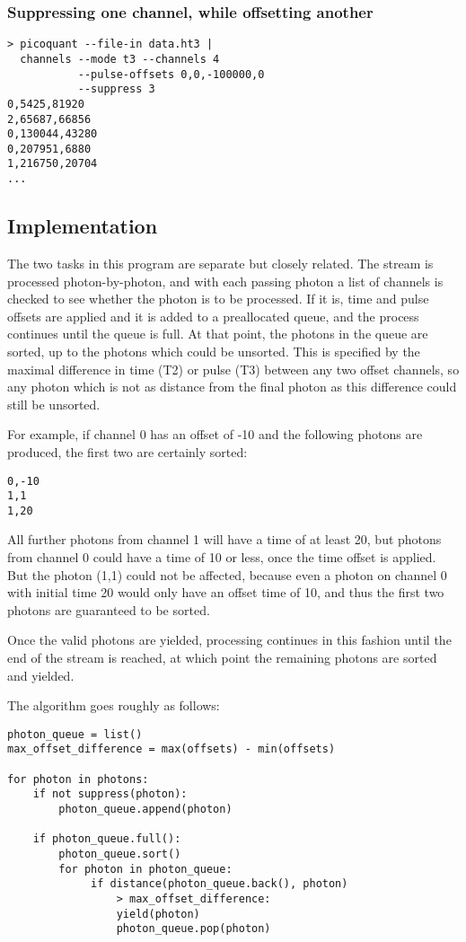 \subsubsection{Suppressing one channel, while offsetting another}
\begin{verbatim}
> picoquant --file-in data.ht3 |
  channels --mode t3 --channels 4 
           --pulse-offsets 0,0,-100000,0
           --suppress 3
0,5425,81920
2,65687,66856
0,130044,43280
0,207951,6880
1,216750,20704
...
\end{verbatim}

\subsection{Implementation}
The two tasks in this program are separate but closely related. The stream is processed photon-by-photon, and with each passing photon a list of channels is checked to see whether the photon is to be processed. If it is, time and pulse offsets are applied and it is added to a preallocated queue, and the process continues until the queue is full. At that point, the photons in the queue are sorted, up to the photons which could be unsorted. This is specified by the maximal difference in time (T2) or pulse (T3) between any two offset channels, so any photon which is not as distance from the final photon as this difference could still be unsorted. 

For example, if channel 0 has an offset of -10 and the following photons are produced, the first two are certainly sorted:
\begin{verbatim}
0,-10
1,1
1,20
\end{verbatim}
All further photons from channel 1 will have a time of at least 20, but photons from channel 0 could have a time of 10 or less, once the time offset is applied. But the photon (1,1) could not be affected, because even a photon on channel 0 with initial time 20 would only have an offset time of 10, and thus the first two photons are guaranteed to be sorted.

Once the valid photons are yielded, processing continues in this fashion until the end of the stream is reached, at which point the remaining photons are sorted and yielded.

The algorithm goes roughly as follows:
\lstset{language=Python}
\begin{lstlisting}
photon_queue = list()
max_offset_difference = max(offsets) - min(offsets)

for photon in photons:
    if not suppress(photon):
        photon_queue.append(photon)
    
    if photon_queue.full():
        photon_queue.sort()
        for photon in photon_queue:
             if distance(photon_queue.back(), photon)
                 > max_offset_difference:
                 yield(photon)
                 photon_queue.pop(photon)
\end{lstlisting}

